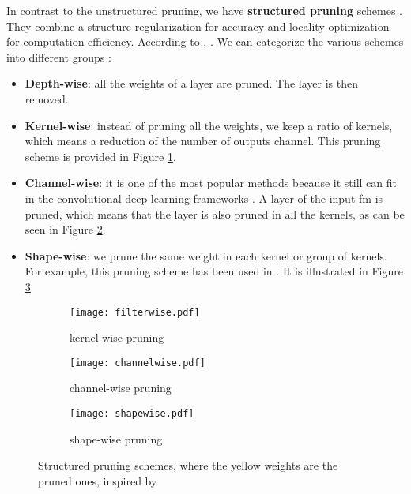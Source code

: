 In contrast to the unstructured pruning, we have \textbf{structured pruning} schemes \cite{kang_accelerator-aware_2020}. They combine a structure regularization for accuracy and locality optimization for computation efficiency. According to \textcite{anwar_structured_2017}, . We can categorize the various schemes into different groups \cite{cheng_recent_2018, kang_accelerator-aware_2020, anwar_structured_2017, wen_learning_2016}:
\begin{itemize}
    \item \textbf{Depth-wise}: all the weights of a layer are pruned. The layer is then removed.
    \item \textbf{Kernel-wise}: instead of pruning all the weights, we keep a ratio of kernels, which means a reduction of the number of outputs channel. This pruning scheme is provided in Figure \ref{fig:struct_pruning:fw}.
    \item \textbf{Channel-wise}: it is one of the most popular methods because it still can fit in the convolutional deep learning frameworks \cite{liu_rethinking_2019}. A layer of the input \acrshort{fm} is pruned, which means that the layer is also pruned in all the kernels, as can be seen in Figure \ref{fig:struct_pruning:chw}.
    \item \textbf{Shape-wise}: we prune the same weight in each kernel or group of kernels. For example, this pruning scheme has been used in \textcite{zhu_efficient_2020}. It is illustrated in Figure \ref{fig:struct_pruning:sw}
\end{itemize}
%
\begin{figure}[H]
    \centering
    \begin{subfigure}[t]{.32\textwidth}
    \centering
    \texttt{[image: filterwise.pdf]}
    \caption{kernel-wise pruning}
    \label{fig:struct_pruning:fw}
    \end{subfigure}
    \begin{subfigure}[t]{.32\textwidth}
    \centering
    \texttt{[image: channelwise.pdf]}
    \caption{channel-wise pruning}
    \label{fig:struct_pruning:chw}
    \end{subfigure}
    \begin{subfigure}[t]{.32\textwidth}
    \centering
    \texttt{[image: shapewise.pdf]}
    \caption{shape-wise pruning}
    \label{fig:struct_pruning:sw}
    \end{subfigure}
    \caption{Structured pruning schemes, where the yellow weights are the pruned ones, inspired by \cite{cheng_recent_2018}}
    \label{fig:struct_pruning}
\end{figure}
